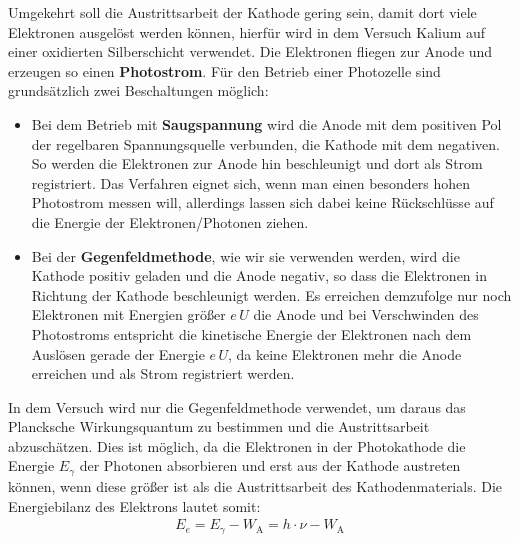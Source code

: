 \documentclass[11pt, a4paper]{article}
\numberwithin{equation}{section}
\begin{document}
Umgekehrt soll die Austrittsarbeit der Kathode gering sein, damit dort viele Elektronen ausgelöst werden können, hierfür wird in dem Versuch Kalium auf einer oxidierten Silberschicht verwendet.
Die Elektronen fliegen zur Anode und erzeugen so einen \textbf{Photostrom}.
Für den Betrieb einer Photozelle sind grundsätzlich zwei Beschaltungen möglich:
\begin{itemize}
\item Bei dem Betrieb mit \textbf{Saugspannung} wird die Anode mit dem positiven Pol der regelbaren Spannungsquelle verbunden, die Kathode mit dem negativen.
So werden die Elektronen zur Anode hin beschleunigt und dort als Strom registriert.
Das Verfahren eignet sich, wenn man einen besonders hohen Photostrom messen will, allerdings lassen sich dabei keine Rückschlüsse auf die Energie der Elektronen/Photonen ziehen.
\item Bei der \textbf{Gegenfeldmethode}, wie wir sie verwenden werden, wird die Kathode positiv geladen und die Anode negativ, so dass die Elektronen in Richtung der Kathode beschleunigt werden.
Es erreichen demzufolge nur noch Elektronen mit Energien größer $e\,U$ die Anode und bei Verschwinden des Photostroms entspricht die kinetische Energie der Elektronen nach dem Auslösen gerade der Energie $e\,U$, da keine Elektronen mehr die Anode erreichen und als Strom registriert werden.
\end{itemize}
In dem Versuch wird nur die Gegenfeldmethode verwendet, um daraus das Plancksche Wirkungsquantum zu bestimmen und die Austrittsarbeit abzuschätzen.
Dies ist möglich, da die Elektronen in der Photokathode die Energie $E_\gamma$ der Photonen absorbieren und erst aus der Kathode austreten können, wenn diese größer ist als die Austrittsarbeit des Kathodenmaterials.
Die Energiebilanz des Elektrons lautet somit:
\begin{align*}
E_e = E_\gamma - W_\mathrm{A} = h \cdot \nu - W_\mathrm{A}
\end{align*}
\end{document}
